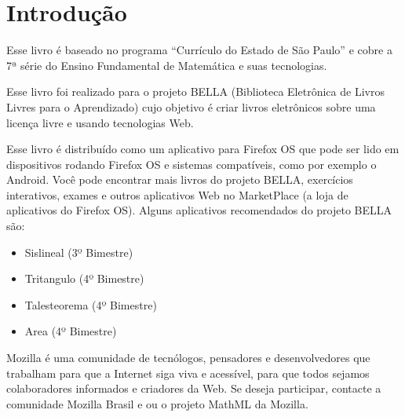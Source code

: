 \section*{Introdução}

Esse livro é baseado no programa ``Currículo do Estado de São Paulo''
e cobre a 7ª série do Ensino Fundamental de Matemática e suas tecnologias.

Esse livro foi realizado para o projeto BELLA
(Biblioteca Eletrônica de Livros Livres para o Aprendizado) cujo objetivo
é criar livros eletrônicos sobre uma licença livre e usando tecnologias Web.

Esse livro é distribuído como um aplicativo para Firefox OS que pode ser lido em
dispositivos rodando Firefox OS e sistemas compatíveis, como por exemplo o
Android. Você pode encontrar mais livros do projeto BELLA, exercícios
interativos, exames e outros aplicativos Web no MarketPlace (a loja de
aplicativos do Firefox OS). Alguns aplicativos recomendados do projeto BELLA
são:

\begin{itemize}
\item Sislineal (3º Bimestre)
\item Tritangulo (4º Bimestre)
\item Talesteorema (4º Bimestre)
\item Area (4º Bimestre)
\end{itemize}

Mozilla é uma comunidade de tecnólogos, pensadores e desenvolvedores que
trabalham para que a Internet siga viva e acessível, para que todos sejamos
colaboradores informados e criadores da Web. Se deseja participar, contacte a
comunidade Mozilla Brasil e ou o projeto MathML da Mozilla.
